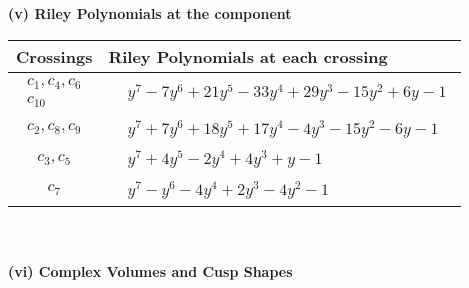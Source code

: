 \documentclass[1p]{elsarticle_modified}
\theoremstyle{definition}
\begin{document}
\newpage\renewcommand{\arraystretch}{1}
\flushleft \textbf{(v) Riley Polynomials at the component}\newline \\
\begin{tabular}{m{50pt}|m{274pt}}
Crossings & \hspace{64pt}Riley Polynomials at each crossing \\
\hline $$\begin{aligned}c_{1},c_{4},c_{6}\\c_{10}\end{aligned}$$&$\begin{aligned}
&y^7-7 y^6+21 y^5-33 y^4+29 y^3-15 y^2+6 y-1
\end{aligned}$\\
\hline $$\begin{aligned}c_{2},c_{8},c_{9}\end{aligned}$$&$\begin{aligned}
&y^7+7 y^6+18 y^5+17 y^4-4 y^3-15 y^2-6 y-1
\end{aligned}$\\
\hline $$\begin{aligned}c_{3},c_{5}\end{aligned}$$&$\begin{aligned}
&y^7+4 y^5-2 y^4+4 y^3+y-1
\end{aligned}$\\
\hline $$\begin{aligned}c_{7}\end{aligned}$$&$\begin{aligned}
&y^7- y^6-4 y^4+2 y^3-4 y^2-1
\end{aligned}$\\
\hline
\end{tabular}\\~\\
\newpage\flushleft \textbf{(vi) Complex Volumes and Cusp Shapes}
\end{document}
